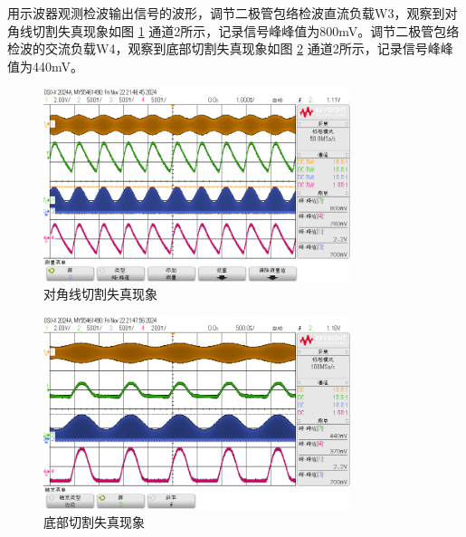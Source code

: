 \documentclass[UTF8]{ctexart}
\begin{document}
用示波器观测检波输出信号的波形，调节二极管包络检波直流负载W3，观察到对角线切割失真现象如图 \ref{fig:51} 通道2所示，记录信号峰峰值为800mV。调节二极管包络检波的交流负载W4，观察到底部切割失真现象如图 \ref{fig:52} 通道2所示，记录信号峰峰值为440mV。
\begin{figure}[H]
    \centering
    \includegraphics[width=0.8\textwidth]{pics/51.png}
    \caption{对角线切割失真现象}\label{fig:51}
\end{figure}
\begin{figure}[H]
    \centering
    \includegraphics[width=0.8\textwidth]{pics/52.png}
    \caption{底部切割失真现象}\label{fig:52}
\end{figure}
\newpage
\end{document}
